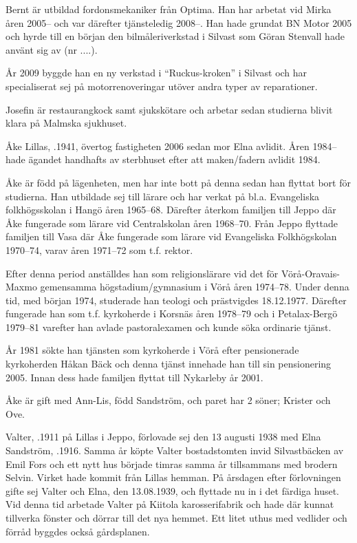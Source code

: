 Bernt är utbildad fordonsmekaniker från Optima. Han har arbetat vid Mirka åren 2005-- och var därefter tjänsteledig 2008--. Han hade grundat BN Motor 2005 och hyrde till en början den bilmåleriverkstad i Silvast som Göran Stenvall hade använt sig av (nr ....).

År 2009 byggde han en ny verkstad i ``Ruckus-kroken'' i Silvast och har specialiserat sej på motorrenoveringar utöver andra typer av 	reparationer.

Josefin är restaurangkock samt sjukskötare och arbetar sedan studierna blivit klara på Malmska sjukhuset.
\begin{jhchildren}
  \item {}
  \item {}
\end{jhchildren}


Åke Lillas, .1941, övertog fastigheten 2006 sedan mor Elna avlidit. Åren 1984-- hade ägandet handhafts av sterbhuset efter	att maken/fadern avlidit 1984.

Åke är född på lägenheten, men har inte bott på denna sedan han	flyttat bort för studierna. Han utbildade sej till lärare och har verkat	på bl.a. Evangeliska folkhögsskolan i Hangö åren 1965--68. Därefter	återkom familjen till Jeppo där Åke fungerade som lärare vid Centralskolan åren 1968--70. Från Jeppo flyttade familjen till Vasa där Åke fungerade som lärare vid Evangeliska Folkhögskolan 1970--74, varav	åren 1971--72 som t.f. rektor.

Efter denna period anställdes han som religionslärare vid det för	Vörå-Oravais-Maxmo gemensamma högstadium/gymnasium i Vörå	åren 1974--78. Under denna tid, med början 1974, studerade han	teologi och prästvigdes 18.12.1977. Därefter fungerade han som t.f.	kyrkoherde i Korsnäs åren 1978--79 och i Petalax-Bergö 1979--81 varefter han avlade pastoralexamen och kunde söka ordinarie tjänst.

År 1981 sökte han tjänsten som kyrkoherde i Vörå efter pensionerade kyrkoherden Håkan Bäck och denna tjänst innehade han till sin pensionering 2005. Innan dess hade familjen flyttat till Nykarleby år 2001.

Åke är gift med Ann-Lis, född Sandström, och paret har 2 söner;	Krister och Ove.


Valter, .1911 på Lillas i Jeppo, förlovade sej den 13 augusti 1938 med Elna Sandström, .1916. Samma år köpte Valter bostadstomten invid Silvastbäcken av Emil Fors och ett nytt hus började timras samma år tillsammans med brodern Selvin. Virket hade kommit från Lillas hemman. På årsdagen efter förlovningen gifte sej Valter och Elna, den 13.08.1939, och flyttade nu in i det färdiga huset. Vid denna tid arbetade Valter på Kiitola karosserifabrik och hade där kunnat tillverka fönster och dörrar till det nya hemmet. Ett litet uthus med vedlider och förråd byggdes också gårdsplanen.

